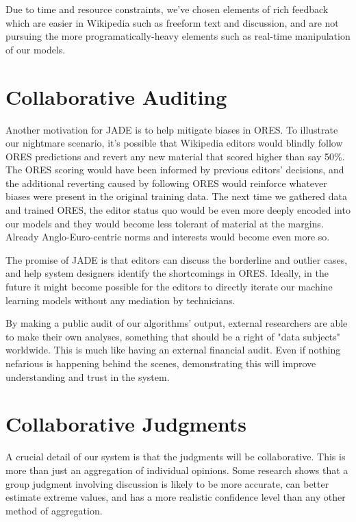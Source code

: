 \documentclass{sigchi-ext}
\begin{document}
Due to time and resource constraints, we've chosen elements of rich feedback which are easier in Wikipedia such as freeform text and discussion, and are not pursuing the more programatically-heavy elements such as real-time manipulation of our models.

\section{Collaborative Auditing}

Another motivation for JADE is to help mitigate biases in ORES.  To illustrate our nightmare scenario, it's possible that Wikipedia editors would blindly follow ORES predictions and revert any new material that scored higher than say 50\%.  The ORES scoring would have been informed by previous editors' decisions, and the additional reverting caused by following ORES would reinforce whatever biases were present in the original training data.  The next time we gathered data and trained ORES, the editor status quo would be even more deeply encoded into our models and they would become less tolerant of material at the margins.  Already Anglo-Euro-centric norms and interests would become even more so.

The promise of JADE is that editors can discuss the borderline and outlier cases, and help system designers identify the shortcomings in ORES.  Ideally, in the future it might become possible for the editors to directly iterate our machine learning models without any mediation by technicians.

By making a public audit of our algorithms' output, external researchers are able to make their own analyses, something that should be a right of "data subjects" worldwide.  This is much like having an external financial audit.  Even if nothing nefarious is happening behind the scenes, demonstrating this will improve understanding and trust in the system.\cite{sandvig2014auditing}

\section{Collaborative Judgments}

A crucial detail of our system is that the judgments will be collaborative.  This is more than just an aggregation of individual opinions.  Some research shows that a group judgment involving discussion is likely to be more accurate, can better estimate extreme values, and has a more realistic confidence level than any other method of aggregation.\cite{sniezek1989accuracy}
\end{document}
